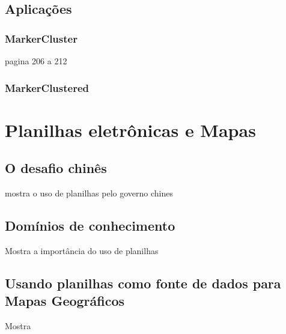 	\subsection{Aplicações}
		\subsubsection{MarkerCluster}
		pagina 206 a 212
		\subsubsection{MarkerClustered}



\section{Planilhas eletrônicas e Mapas}
\subsection{O desafio chinês}
mostra o uso de planilhas pelo governo chines \cite{chinaPlanilha}
\subsection{Domínios de conhecimento}
Mostra a importância do uso de planilhas \cite{credinePlanilha} 
\subsection{Usando planilhas como fonte de dados para Mapas Geográficos}
Mostra \cite{lieberman2009spatio}